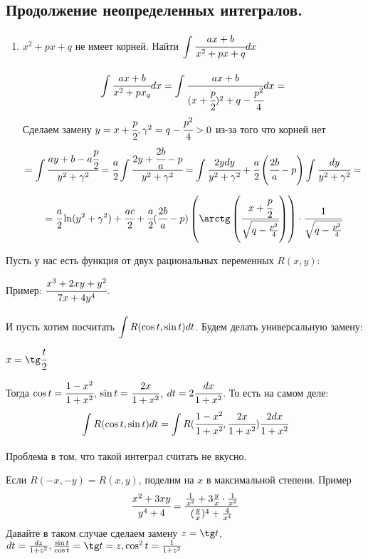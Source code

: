 \subsection{Продолжение неопределенных интегралов.}

\begin{enumerate}
    \item $x^2+px+ q$ не имеет корней. Найти $\displaystyle\int\limits_{}^{}\cfrac{ax+b} {x^2+px+q}dx$
    $$\displaystyle\int\limits_{}^{} \cfrac{ax+b}{x^2+px_q}dx = \displaystyle\int\limits_{}^{}\cfrac{ax+b}{(x+\cfrac{p}{2})^2 + q -\cfrac{p^2}{4}}dx =$$
    Сделаем замену $y = x + \cfrac{p}{2}, \gamma^2 = q-\cfrac{p^2}{4}>0$ из-за того что корней нет
    $$ = \displaystyle\int\limits_{}^{}\cfrac{ay+b-a\cfrac{p}{2}}{y^2+\gamma^2}=\cfrac{a}{2}\displaystyle\int\limits_{}^{}\cfrac{2y+\cfrac{2b}{a}-p}{y^2+\gamma^2} = \displaystyle\int\limits_{}^{}\cfrac{2ydy}{y^2+\gamma^2} + \cfrac{a}{2}\left(\cfrac{2b}{a}-p\right)\displaystyle\int\limits_{}^{}\cfrac{dy}{y^2+\gamma^2} = $$
    $$= \cfrac{a}{2}\ln (y^2 + \gamma^2) + \cfrac{ac}{2} + \cfrac{a}{2}(\cfrac{2b}{a}-p)\left(\arctg\left( \cfrac{x+ \cfrac{p}{2}}{\sqrt{q-\frac{p^2}{4}}}\right)\right)\cdot \cfrac{1}{\sqrt{q-\frac{p^2}{4}}}$$
\end{enumerate}
Пусть у нас есть функция от двух рациональных переменных $R(x,y)$:

Пример: $\cfrac{x^3+2xy +y^2}{7x+4y^4}$.

И пусть хотим посчитать $\displaystyle\int\limits_{}^{}R(\cos t, \sin t) dt$. Будем делать универсальную замену: $x = \tg \cfrac{t}{2}$

Тогда $\cos t = \cfrac{1-x^2}{1+x^2}$, $\sin t= \cfrac{2x}{1+x^2}$, $dt = 2 \cfrac{dx}{1+x^2}$. То есть на самом деле:
$$\displaystyle\int\limits_{}^{}R(\cos t, \sin t)dt = \displaystyle\int\limits_{}^{}R(\cfrac{1-x^2}{1+x^2},\cfrac{2x}{1+x^2})\cfrac{2dx}{1+x^2}$$
Проблема в том, что такой интеграл считать не вкусно.

Если $R(-x,-y ) = R(x,y)$, поделим на $x$ в максимальной степени. Пример
$$\cfrac{x^2+3xy}{y^4+4} = \cfrac{\frac{1}{x^2}+3\frac{y}{x}\cdot \frac{1}{x^2}}{(\frac{y}{x})^4 + \frac{4}{x^4}}$$
Давайте в таком случае сделаем замену $z = \tg t$, $dt = \frac{dz}{1+z^2}, \frac{\sin t}{\cos t} = \tg t = z, \cos^2 t =\frac{1}{1+z^2}$


